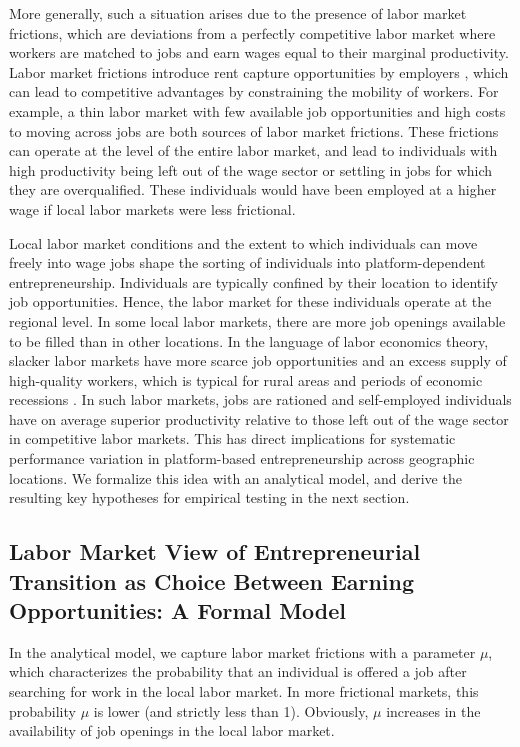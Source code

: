 \documentclass[letterpaper,12pt]{article}
\begin{document}
More generally, such a situation arises due to the presence of labor market frictions, which are deviations from a perfectly competitive labor market where workers are matched to jobs and earn wages equal to their marginal productivity. Labor market frictions introduce rent capture opportunities by employers \citep{mahoney_market_2013,campbell_bridging_2017}, which can lead to competitive advantages by constraining the mobility of workers. For example, a thin labor market with few available job opportunities and high costs to moving across jobs \citep{campbell_bridging_2017} are both sources of labor market frictions. These frictions can operate at the level of the entire labor market, and lead to individuals with high productivity being left out of the wage sector or settling in jobs for which they are overqualified. These individuals would have been employed at a higher wage if local labor markets were less frictional. 


Local labor market conditions and the extent to which individuals can move freely into wage jobs shape the sorting of individuals into platform-dependent entrepreneurship. Individuals are typically confined by their location to identify job opportunities. Hence, the labor market for these individuals operate at the regional level. In some local labor markets, there are more job openings available to be filled than in other locations. In the language of labor economics theory, slacker labor markets have more scarce job opportunities and an excess supply of high-quality workers, which is typical for rural areas \citep{breza_labor_2021} and periods of economic recessions \citep{michaillat_matching_2012}. In such labor markets, jobs are rationed and self-employed individuals have on average superior productivity relative to those left out of the wage sector in competitive labor markets. This has direct implications for systematic performance variation in platform-based entrepreneurship across geographic locations. We formalize this idea with an analytical model, and derive the resulting key hypotheses for empirical testing in the next section.





\subsection{Labor Market View of Entrepreneurial Transition as Choice Between Earning Opportunities: A Formal Model}

In the analytical model, we capture labor market frictions with a parameter $\mu$, which characterizes the probability that an individual is offered a job after searching for work in the local labor market. In more frictional markets, this probability $\mu$ is lower (and strictly less than 1). Obviously, $\mu$ increases in the availability of job openings in the local labor market.
\end{document}
